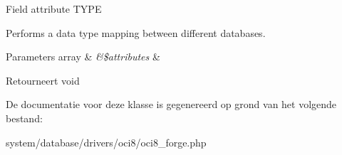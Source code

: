 Field attribute T\+Y\+PE

Performs a data type mapping between different databases.


\begin{DoxyParams}[1]{Parameters}
array & {\em \&\$attributes} & \\
\hline
\end{DoxyParams}
\begin{DoxyReturn}{Retourneert}
void 
\end{DoxyReturn}


De documentatie voor deze klasse is gegenereerd op grond van het volgende bestand\+:\begin{DoxyCompactItemize}
\item 
system/database/drivers/oci8/oci8\+\_\+forge.\+php\end{DoxyCompactItemize}
